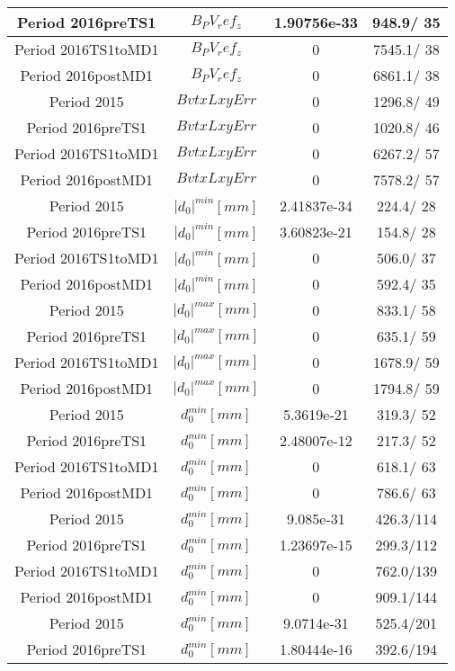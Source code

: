 \documentclass{article}
\begin{document}
\begin{longtable}{c|c|c|c}
\hline
 Period 2016preTS1 & $B_PV_ref_z$ & 1.90756e-33 & 948.9/ 35\\
\hline
 Period 2016TS1toMD1 & $B_PV_ref_z$ & 0 & 7545.1/ 38\\
\hline
 Period 2016postMD1 & $B_PV_ref_z$ & 0 & 6861.1/ 38\\
\hline
 Period 2015 & $BvtxLxyErr$ & 0 & 1296.8/ 49\\
\hline
 Period 2016preTS1 & $BvtxLxyErr$ & 0 & 1020.8/ 46\\
\hline
 Period 2016TS1toMD1 & $BvtxLxyErr$ & 0 & 6267.2/ 57\\
\hline
 Period 2016postMD1 & $BvtxLxyErr$ & 0 & 7578.2/ 57\\
\hline
 Period 2015 & $|d_{0}|^{min} [mm]$ & 2.41837e-34 & 224.4/ 28\\
\hline
 Period 2016preTS1 & $|d_{0}|^{min} [mm]$ & 3.60823e-21 & 154.8/ 28\\
\hline
 Period 2016TS1toMD1 & $|d_{0}|^{min} [mm]$ & 0 & 506.0/ 37\\
\hline
 Period 2016postMD1 & $|d_{0}|^{min} [mm]$ & 0 & 592.4/ 35\\
\hline
 Period 2015 & $|d_{0}|^{max} [mm]$ & 0 & 833.1/ 58\\
\hline
 Period 2016preTS1 & $|d_{0}|^{max} [mm]$ & 0 & 635.1/ 59\\
\hline
 Period 2016TS1toMD1 & $|d_{0}|^{max} [mm]$ & 0 & 1678.9/ 59\\
\hline
 Period 2016postMD1 & $|d_{0}|^{max} [mm]$ & 0 & 1794.8/ 59\\
\hline
 Period 2015 & $d_{0}^{min} [mm]$ & 5.3619e-21 & 319.3/ 52\\
\hline
 Period 2016preTS1 & $d_{0}^{min} [mm]$ & 2.48007e-12 & 217.3/ 52\\
\hline
 Period 2016TS1toMD1 & $d_{0}^{min} [mm]$ & 0 & 618.1/ 63\\
\hline
 Period 2016postMD1 & $d_{0}^{min} [mm]$ & 0 & 786.6/ 63\\
\hline
 Period 2015 & $d_{0}^{min} [mm]$ & 9.085e-31 & 426.3/114\\
\hline
 Period 2016preTS1 & $d_{0}^{min} [mm]$ & 1.23697e-15 & 299.3/112\\
\hline
 Period 2016TS1toMD1 & $d_{0}^{min} [mm]$ & 0 & 762.0/139\\
\hline
 Period 2016postMD1 & $d_{0}^{min} [mm]$ & 0 & 909.1/144\\
\hline
 Period 2015 & $d_{0}^{min} [mm]$ & 9.0714e-31 & 525.4/201\\
\hline
 Period 2016preTS1 & $d_{0}^{min} [mm]$ & 1.80444e-16 & 392.6/194\\

\end{longtable}
\end{document}

